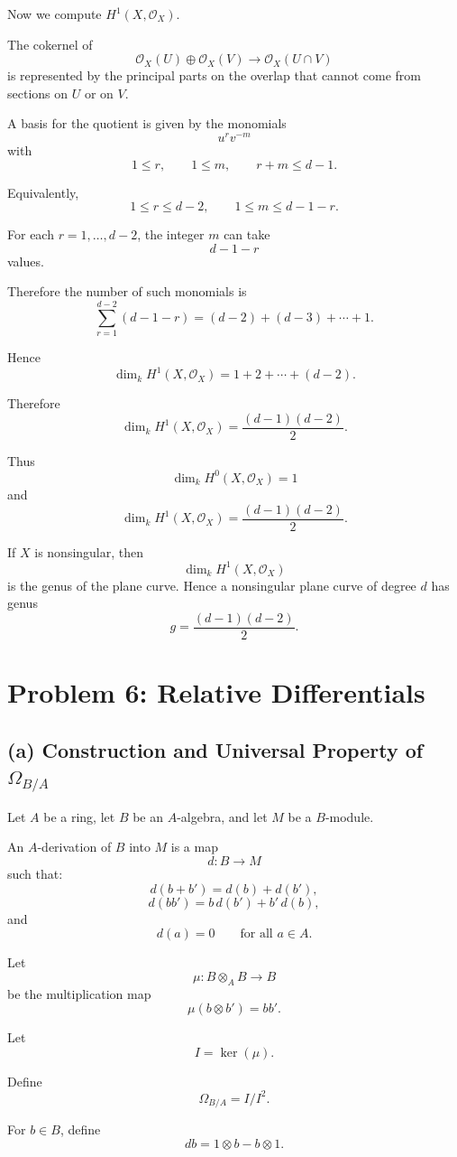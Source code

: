 \documentclass[12pt,a4paper]{article}
\theoremstyle{notespace}
\begin{document}
Now we compute \(H^1(X,\mathcal O_X)\).

The cokernel of
\[
\mathcal O_X(U)\oplus\mathcal O_X(V)
\longrightarrow
\mathcal O_X(U\cap V)
\]
is represented by the principal parts on the overlap that cannot come from
sections on \(U\) or on \(V\).

A basis for the quotient is given by the monomials
\[
u^r v^{-m}
\]
with
\[
1\leq r,
\qquad
1\leq m,
\qquad
r+m\leq d-1.
\]

Equivalently,
\[
1\leq r\leq d-2,
\qquad
1\leq m\leq d-1-r.
\]

For each \(r=1,\ldots,d-2\), the integer \(m\) can take
\[
d-1-r
\]
values.

Therefore the number of such monomials is
\[
\sum_{r=1}^{d-2}(d-1-r)
=
(d-2)+(d-3)+\cdots+1.
\]

Hence
\[
\dim_k H^1(X,\mathcal O_X)
=
1+2+\cdots+(d-2).
\]

Therefore
\[
\dim_k H^1(X,\mathcal O_X)
=
\frac{(d-1)(d-2)}2.
\]

Thus
\[
\boxed{
	\dim_k H^0(X,\mathcal O_X)=1
}
\]
and
\[
\boxed{
	\dim_k H^1(X,\mathcal O_X)=\frac{(d-1)(d-2)}2.
}
\]

If \(X\) is nonsingular, then
\[
\dim_k H^1(X,\mathcal O_X)
\]
is the genus of the plane curve. Hence a nonsingular plane curve of degree
\(d\) has genus
\[
\boxed{
	g=\frac{(d-1)(d-2)}2.
}
\]

\section{Problem 6: Relative Differentials}

\subsection*{(a) Construction and Universal Property of \(\Omega_{B/A}\)}

Let \(A\) be a ring, let \(B\) be an \(A\)-algebra, and let \(M\) be a
\(B\)-module.

An \(A\)-derivation of \(B\) into \(M\) is a map
\[
d:B\to M
\]
such that:
\[
d(b+b')=d(b)+d(b'),
\]
\[
d(bb')=b\,d(b')+b'\,d(b),
\]
and
\[
d(a)=0
\qquad
\text{for all }a\in A.
\]

Let
\[
\mu:B\otimes_A B\longrightarrow B
\]
be the multiplication map
\[
\mu(b\otimes b')=bb'.
\]

Let
\[
I=\ker(\mu).
\]

Define
\[
\Omega_{B/A}=I/I^2.
\]

For \(b\in B\), define
\[
db=1\otimes b-b\otimes1.
\]
\end{document}
